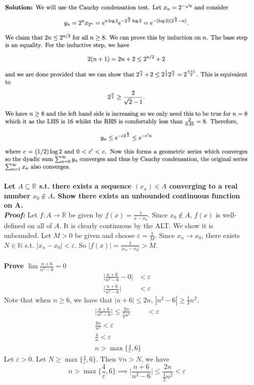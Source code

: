 \documentclass{letter}
\begin{document}
\begin{center}
  \includegraphics[scale = 0.5]{seq}  
\end{center}
\textbf{Let $A \subseteq \mathbb{R}$ s.t. there exists a sequence $(x_n) \in
A$ converging to a real number $x_0 \not\in A$. Show there exists an
unbounded continuous function on A.} \\
\textit{\textbf{Proof:}} Let $f : A \to \mathbb{R}$ be given by $f(x)
= \frac{1}{x - x_0}$. Since $x_0 \not\in A$, $f(x)$ is well-defined on
all of $A$. It is clearly continuous by the ALT. We show it is
unbounded. Let $M > 0$ be given and choose $\varepsilon =
\frac{1}{M}$. Since $x_n \to x_0$, there exists $N \in \mathbb{N}$
s.t. $|x_n - x_0| < \varepsilon$. So $\left| f(x) \right| =
\frac{1}{\left| x_n - x_0 \right|} > M$. \\ \\
\textbf{Prove $\lim \frac{n + 6}{n^2 - 6} = 0$}
\begin{align*}
  \bigg| \frac{n + 6}{n^2 - 6} - 0 \bigg| &< \varepsilon \\
  \bigg| \frac{n + 6}{n^2 - 6} \bigg| &< \varepsilon
\end{align*}
Note that when $n \geq 6$, we have that $|n + 6| \leq 2n$, $|n^2 - 6|
\geq \frac{1}{2}n^2$.
\begin{align*}
  \bigg| \frac{n + 6}{n^2 - 6} \bigg| \leq \frac{2n}{\frac{1}{2}n^2}
  &< \varepsilon \\
  \frac{4n}{n^2} < \varepsilon \\
  \frac{4}{n} < \varepsilon \\
  n > \max{\{\frac{4}{\varepsilon}, 6\}}
\end{align*}
Let $\varepsilon > 0$. Let $N \geq \max{\{\frac{4}{\varepsilon}, 6\}}$. Then
$\forall n > N$, we have
\[n > \max{\{\frac{4}{\varepsilon}, 6\}} \implies \bigg| \frac{n + 6}{n^2 - 6}
  \bigg| \leq \frac{2n}{\frac{1}{2}n^2} < \varepsilon\]
\end{document}
